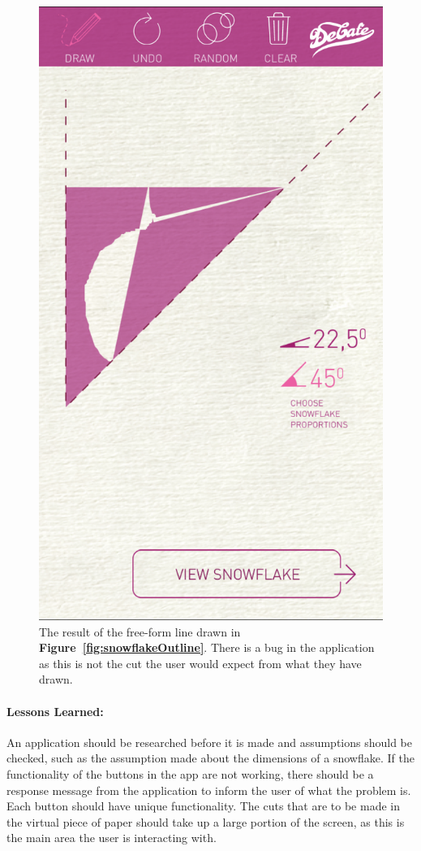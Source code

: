 \documentclass[11pt]{article}
\begin{document}
\begin{figure}[!ht]
\begin{minipage}{0.45\textwidth}
                            \includegraphics[width=0.7\linewidth]{Images/snowflakeCut}
                            \caption{The result of the free-form line drawn in \textbf{Figure~\ref{fig:snowflakeOutline}}. There is a bug in the application as this is not the cut the user would expect from what they have drawn.}
                            \label{fig:snowflakeCut}
                        \end{minipage}
                    \end{figure}
        
                \paragraph{Lessons Learned:}
                An application should be researched before it is made and assumptions should be checked, such as the assumption made about the dimensions of a snowflake. If the functionality of the buttons in the app are not working, there should be a response message from the application to inform the user of what the problem is. Each button should have unique functionality. The cuts that are to be made in the virtual piece of paper should take up a large portion of the screen, as this is the main area the user is interacting with.
            
\end{document}
